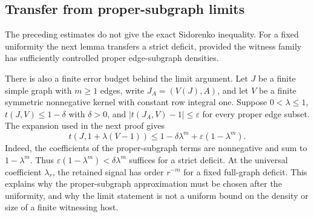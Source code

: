 \documentclass[a4paper,11pt,reqno]{amsart}
\theoremstyle{plain}
\theoremstyle{definition}
\theoremstyle{remark}
\begin{document}
\subsection{Transfer from proper-subgraph limits}

The preceding estimates do not give the exact Sidorenko inequality.
For a fixed uniformity the next lemma transfers a strict deficit,
provided the witness family has sufficiently controlled proper
edge-subgraph densities.

There is also a finite error budget behind the limit argument.
Let $J$ be a finite simple graph with $m\ge1$ edges, write
$J_A=(V(J),A)$, and let $V$ be a finite symmetric nonnegative
kernel with constant row integral one.  Suppose $0<\lambda\le1$,
$t(J,V)\le1-\delta$ with $\delta>0$,
and $|t(J_A,V)-1|\le\varepsilon$ for every proper edge subset.
The expansion used in the next proof gives
\begin{equation}\label{density-transfer-error-budget}
 t(J,1+\lambda(V-1))
 \le1-\delta\lambda^m+\varepsilon(1-\lambda^m).
\end{equation}
Indeed, the coefficients of the proper-subgraph terms are
nonnegative and sum to $1-\lambda^m$.  Thus
$\varepsilon(1-\lambda^m)<\delta\lambda^m$ suffices for a strict
deficit.  At the universal coefficient $\lambda_r$, the retained
signal has order $r^{-m}$ for a fixed full-graph deficit.  This
explains why the proper-subgraph approximation must be chosen after
the uniformity, and why the limit statement is not a uniform bound
on the density or size of a finite witnessing host.
\end{document}
